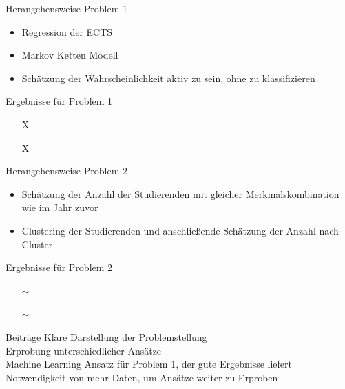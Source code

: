 \documentclass[17pt, fleqn]{beamer}
\begin{document}
\begin{frame}{Herangehensweise Problem 1}
    \begin{itemize}
        \item Regression der ECTS \\[1cm]
        \pause
        \item Markov Ketten Modell \\[1cm]
        \pause
        \item Schätzung der Wahrscheinlichkeit aktiv zu sein, ohne zu klassifizieren
    \end{itemize}
    
\end{frame}

\begin{frame}{Ergebnisse für Problem 1}
    \begin{itemize}
        \item[X]
        \item[X]
        \item[\checkmark] 
    \end{itemize}

    
\end{frame}

\begin{frame}{Herangehensweise Problem 2}
    \begin{itemize}
        \item Schätzung der Anzahl der Studierenden mit gleicher Merkmalskombination wie im Jahr zuvor \\[1cm]
        \pause
        \item Clustering der Studierenden und anschließende Schätzung der Anzahl nach Cluster
    \end{itemize}
    
\end{frame}

\begin{frame}{Ergebnisse für Problem 2}
    \begin{itemize}
        \item[$\sim$]
        \item[$\sim$] 
    \end{itemize}
    
\end{frame}

\begin{frame}{Beiträge}
    Klare Darstellung der Problemstellung \\[1cm]
    \pause
    Erprobung unterschiedlicher Ansätze \\[1cm]
    \pause
    Machine Learning Ansatz für Problem 1, der gute Ergebnisse liefert \\[1cm]
    \pause
    Notwendigkeit von mehr Daten, um Ansätze weiter zu Erproben
    
\end{frame}
\end{document}
